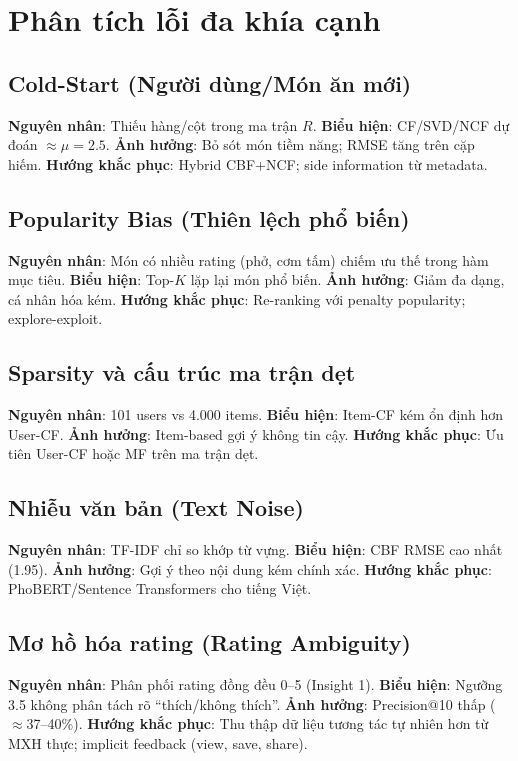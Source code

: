 \documentclass[11pt]{article}
\begin{document}
\section{Phân tích lỗi đa khía cạnh}
\label{sec:error}

\subsection{Cold-Start (Người dùng/Món ăn mới)}
\textbf{Nguyên nhân}: Thiếu hàng/cột trong ma trận $R$. \textbf{Biểu hiện}: CF/SVD/NCF dự đoán $\approx \mu=2.5$. \textbf{Ảnh hưởng}: Bỏ sót món tiềm năng; RMSE tăng trên cặp hiếm. \textbf{Hướng khắc phục}: Hybrid CBF+NCF; side information từ metadata.

\subsection{Popularity Bias (Thiên lệch phổ biến)}
\textbf{Nguyên nhân}: Món có nhiều rating (phở, cơm tấm) chiếm ưu thế trong hàm mục tiêu. \textbf{Biểu hiện}: Top-$K$ lặp lại món phổ biến. \textbf{Ảnh hưởng}: Giảm đa dạng, cá nhân hóa kém. \textbf{Hướng khắc phục}: Re-ranking với penalty popularity; explore-exploit.

\subsection{Sparsity và cấu trúc ma trận dẹt}
\textbf{Nguyên nhân}: 101 users vs 4.000 items. \textbf{Biểu hiện}: Item-CF kém ổn định hơn User-CF. \textbf{Ảnh hưởng}: Item-based gợi ý không tin cậy. \textbf{Hướng khắc phục}: Ưu tiên User-CF hoặc MF trên ma trận dẹt.

\subsection{Nhiễu văn bản (Text Noise)}
\textbf{Nguyên nhân}: TF-IDF chỉ so khớp từ vựng. \textbf{Biểu hiện}: CBF RMSE cao nhất (1.95). \textbf{Ảnh hưởng}: Gợi ý theo nội dung kém chính xác. \textbf{Hướng khắc phục}: PhoBERT/Sentence Transformers cho tiếng Việt.

\subsection{Mơ hồ hóa rating (Rating Ambiguity)}
\textbf{Nguyên nhân}: Phân phối rating đồng đều 0--5 (Insight 1). \textbf{Biểu hiện}: Ngưỡng 3.5 không phân tách rõ ``thích/không thích''. \textbf{Ảnh hưởng}: Precision@10 thấp ($\approx$37--40\%). \textbf{Hướng khắc phục}: Thu thập dữ liệu tương tác tự nhiên hơn từ MXH thực; implicit feedback (view, save, share).
\end{document}
